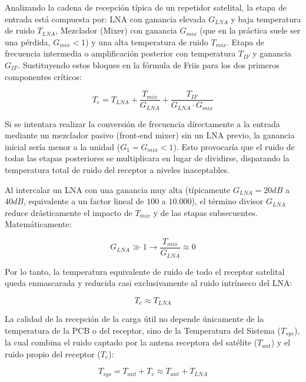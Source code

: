 \documentclass[11pt,a4paper,twoside]{report}
\begin{document}
	Analizando la cadena de recepción típica de un repetidor satelital, la etapa de entrada está compuesta por: LNA con ganancia elevada $G_{LNA}$ y baja temperatura de ruido $T_{LNA}$, Mezclador (Mixer) con ganancia $G_{mix}$ (que en la práctica suele ser una pérdida, $G_{mix} < 1$) y una alta temperatura de ruido $T_{mix}$. Etapa de frecuencia intermedia o amplificación posterior con temperatura $T_{IF}$ y ganancia $G_{IF}$. Sustituyendo estos bloques en la fórmula de Friis para los dos primeros componentes críticos:
	
	\begin{equation}
		T_e = T_{LNA} + \frac{T_{mix}}{G_{LNA}} + \frac{T_{IF}}{G_{LNA} \cdot G_{mix}}
	\end{equation}
	
	Si se intentara realizar la conversión de frecuencia directamente a la entrada mediante un mezclador pasivo (front-end mixer) sin un LNA previo, la ganancia inicial sería menor a la unidad ($G_1 = G_{mix} < 1$). Esto provocaría que el ruido de todas las etapas posteriores se multiplicara en lugar de dividirse, disparando la temperatura total de ruido del receptor a niveles inaceptables.
	
	Al intercalar un LNA con una ganancia muy alta (típicamente $G_{LNA} = 20dB$ a $40dB$, equivalente a un factor lineal de $100$ a $10.000$), el término divisor $G_{LNA}$ reduce drásticamente el impacto de $T_{mix}$ y de las etapas subsecuentes. Matemáticamente:
	
	\begin{equation}
		G_{LNA} \gg 1  \longrightarrow \frac{T_{mix}}{G_{LNA}} \approx 0
	\end{equation}
	
	Por lo tanto, la temperatura equivalente de ruido de todo el receptor satelital queda enmascarada y reducida casi exclusivamente al ruido intrínseco del LNA:
	
	\begin{equation}
		T_e \approx T_{LNA}
	\end{equation}
	
	La calidad de la recepción de la carga útil no depende únicamente de la temperatura de la PCB o del receptor, sino de la Temperatura del Sistema ($T_{sys}$), la cual combina el ruido captado por la antena receptora del satélite ($T_{ant}$) y el ruido propio del receptor ($T_e$):
	
	\begin{equation}
		T_{sys} = T_{ant} + T_e \approx T_{ant} + T_{LNA}
	\end{equation}
	
\end{document}
